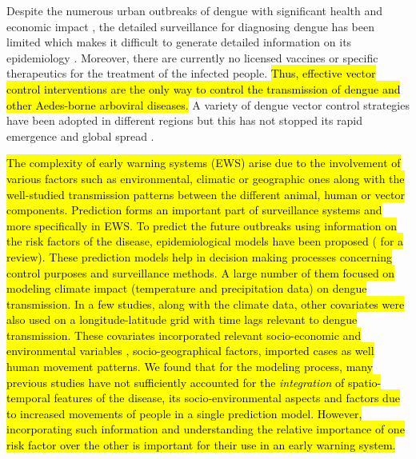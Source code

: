 \documentclass{bmcart}
\begin{document}
Despite the numerous urban outbreaks of dengue with significant health and economic impact \cite{gubler2002epidemic,gubler2004cities,anuradha19981996,vaughn2000invited}, the detailed surveillance for diagnosing dengue has been limited which makes it difficult to generate detailed information on its epidemiology \cite{ooi2009dengue,guzman2004dengue}. Moreover, there are currently no licensed vaccines or specific therapeutics for the treatment of the infected people. \hl{Thus, effective vector control interventions are the only way to control the transmission of dengue and other Aedes-borne arboviral diseases.} A variety of dengue vector control strategies \cite{wilder2012denguetools} have been adopted in different regions\cite{erlanger2008effect,horstick2010dengue,vanlerberghe2009community,luz2011dengue} but this has not stopped its rapid emergence and global spread \cite{tatem2006global}.

\hl{The complexity of early warning systems (EWS) arise due to the involvement of various factors such as environmental, climatic or geographic ones along with the well-studied transmission patterns between the different animal, human or vector components. Prediction forms an important part of surveillance systems and more specifically in EWS. To predict the future outbreaks using information on the risk factors of the disease, epidemiological models have been proposed (\cite{racloz2012surveillance} for a review). These prediction models help in decision making processes concerning control purposes and surveillance methods. A large number of them \cite{degallier2010toward, naish2014climate, hii2012forecast} focused on modeling climate impact (temperature and precipitation data) on dengue transmission. In a few studies, along with the climate data, other covariates were also used on a longitude-latitude grid with time lags relevant to dengue transmission. These covariates incorporated relevant socio-economic and environmental variables \cite{lowe2011spatio, banu2011dengue}, socio-geographical factors\cite{toledo2011evidence, tipayamongkholgul2011socio}, imported cases\cite{shang2010role, sang2015predicting} as well human movement patterns\cite{stoddard2013house, reiner2014socially}. We found that for the modeling process, many previous studies have not sufficiently accounted for the \textit{integration} of spatio-temporal features of the disease, its socio-environmental aspects and factors due to increased movements of people in a single prediction model. However, incorporating such information and understanding the relative importance of one risk factor over the other is important for their use in an early warning system.}
\end{document}
